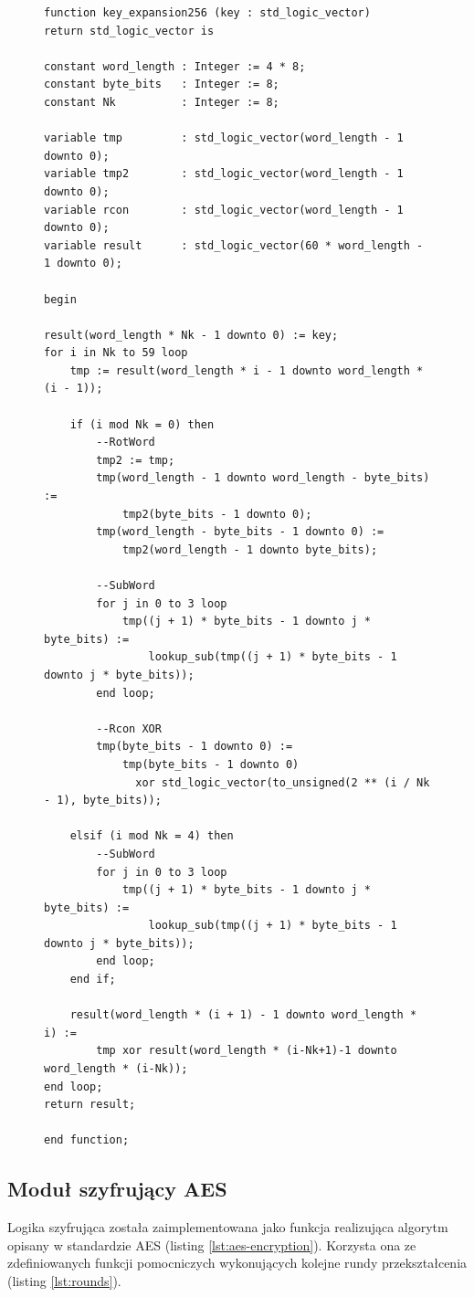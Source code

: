 \begin{figure}[!p]
\begin{lstlisting}[style=vhdl, captionpos=b, caption={Implementacja rozwinięcia klucza -- \textit{Rijndael key schedule}}, label={lst:key-schedule}]
function key_expansion256 (key : std_logic_vector) 
return std_logic_vector is

constant word_length : Integer := 4 * 8;
constant byte_bits   : Integer := 8;
constant Nk          : Integer := 8;
	
variable tmp         : std_logic_vector(word_length - 1 downto 0);
variable tmp2        : std_logic_vector(word_length - 1 downto 0);
variable rcon        : std_logic_vector(word_length - 1 downto 0);
variable result      : std_logic_vector(60 * word_length - 1 downto 0);

begin

result(word_length * Nk - 1 downto 0) := key;
for i in Nk to 59 loop
	tmp := result(word_length * i - 1 downto word_length * (i - 1));
	
	if (i mod Nk = 0) then
		--RotWord
		tmp2 := tmp;
		tmp(word_length - 1 downto word_length - byte_bits) := 
			tmp2(byte_bits - 1 downto 0);
		tmp(word_length - byte_bits - 1 downto 0) := 
			tmp2(word_length - 1 downto byte_bits);

		--SubWord
		for j in 0 to 3 loop
			tmp((j + 1) * byte_bits - 1 downto j * byte_bits) := 
				lookup_sub(tmp((j + 1) * byte_bits - 1 downto j * byte_bits));
		end loop;

		--Rcon XOR
		tmp(byte_bits - 1 downto 0) := 
			tmp(byte_bits - 1 downto 0) 
			  xor std_logic_vector(to_unsigned(2 ** (i / Nk - 1), byte_bits));

	elsif (i mod Nk = 4) then
		--SubWord
		for j in 0 to 3 loop
			tmp((j + 1) * byte_bits - 1 downto j * byte_bits) := 
				lookup_sub(tmp((j + 1) * byte_bits - 1 downto j * byte_bits));
		end loop;
	end if;
	
	result(word_length * (i + 1) - 1 downto word_length * i) := 
		tmp xor result(word_length * (i-Nk+1)-1 downto word_length * (i-Nk));
end loop;
return result;

end function;
\end{lstlisting}
\end{figure}

\newpage
\subsection{Moduł szyfrujący AES}
Logika szyfrująca została zaimplementowana jako funkcja realizująca algorytm opisany w standardzie AES \cite[rozdz. 5.1, rys. 5]{aes-standard} (listing \ref{lst:aes-encryption}). Korzysta ona ze zdefiniowanych funkcji pomocniczych wykonujących kolejne rundy przekształcenia (listing \ref{lst:rounds}).

